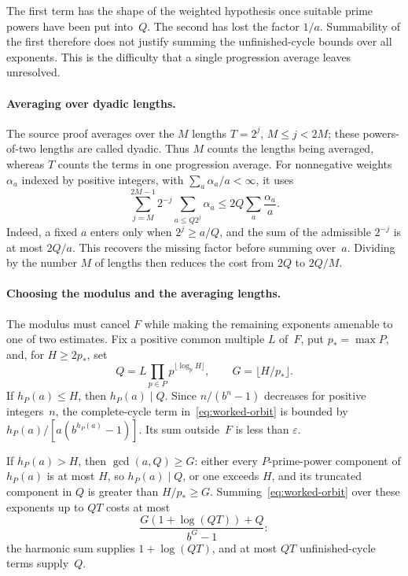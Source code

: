 \documentclass[10pt]{article}
\begin{document}
The first term has the shape of the weighted hypothesis once suitable prime powers have been put into~$Q$. The second has lost the factor $1/a$. Summability of the first therefore does not justify summing the unfinished-cycle bounds over all exponents. This is the difficulty that a single progression average leaves unresolved.

\paragraph{Averaging over dyadic lengths.}
The source proof averages over the $M$ lengths $T=2^j$, $M\le j<2M$; these powers-of-two lengths are called dyadic. Thus $M$ counts the lengths being averaged, whereas $T$ counts the terms in one progression average. For nonnegative weights $\alpha_a$ indexed by positive integers, with $\sum_a\alpha_a/a<\infty$, it uses
\begin{equation}\label{eq:worked-dyadic}
 \sum_{j=M}^{2M-1}2^{-j}\sum_{a\le Q2^j}\alpha_a
 \le 2Q\sum_a\frac{\alpha_a}{a}.
\end{equation}
Indeed, a fixed $a$ enters only when $2^j\ge a/Q$, and the sum of the admissible $2^{-j}$ is at most $2Q/a$. This recovers the missing factor before summing over~$a$. Dividing by the number $M$ of lengths then reduces the cost from $2Q$ to $2Q/M$.

\paragraph{Choosing the modulus and the averaging lengths.}
The modulus must cancel $F$ while making the remaining exponents amenable to one of two estimates. Fix a positive common multiple $L$ of~$F$, put $p_*=\max P$, and, for $H\ge2p_*$, set
\[
 Q=L\prod_{p\in P}p^{\lfloor\log_p H\rfloor},\qquad
 G=\lfloor H/p_*\rfloor.
\]
If $h_P(a)\le H$, then $h_P(a)\mid Q$. Since $n/(b^n-1)$ decreases for positive integers~$n$, the complete-cycle term in~\eqref{eq:worked-orbit} is bounded by $h_P(a)/[a(b^{h_P(a)}-1)]$. Its sum outside~$F$ is less than $\varepsilon$.

If $h_P(a)>H$, then $\gcd(a,Q)\ge G$: either every $P$-prime-power component of $h_P(a)$ is at most $H$, so $h_P(a)\mid Q$, or one exceeds $H$, and its truncated component in $Q$ is greater than $H/p_*\ge G$. Summing~\eqref{eq:worked-orbit} over these exponents up to $QT$ costs at most
\[
 \frac{G(1+\log(QT))+Q}{b^G-1}:
\]
the harmonic sum supplies $1+\log(QT)$, and at most $QT$ unfinished-cycle terms supply~$Q$.
\end{document}
